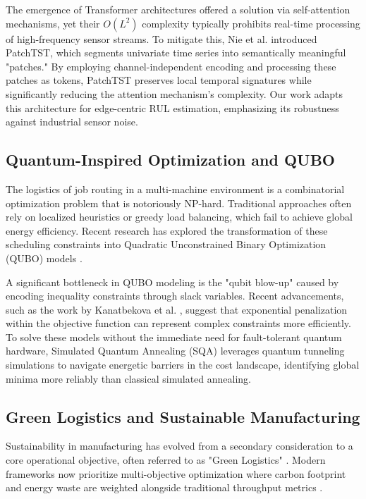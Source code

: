 \documentclass[conference]{IEEEtran}
\begin{document}
The emergence of Transformer architectures offered a solution via self-attention mechanisms, yet their $O(L^2)$ complexity typically prohibits real-time processing of high-frequency sensor streams. To mitigate this, Nie et al. \cite{nie2023patchtst} introduced PatchTST, which segments univariate time series into semantically meaningful "patches." By employing channel-independent encoding and processing these patches as tokens, PatchTST preserves local temporal signatures while significantly reducing the attention mechanism's complexity. Our work adapts this architecture for edge-centric RUL estimation, emphasizing its robustness against industrial sensor noise.

\subsection{Quantum-Inspired Optimization and QUBO}
The logistics of job routing in a multi-machine environment is a combinatorial optimization problem that is notoriously NP-hard. Traditional approaches often rely on localized heuristics or greedy load balancing, which fail to achieve global energy efficiency. Recent research has explored the transformation of these scheduling constraints into Quadratic Unconstrained Binary Optimization (QUBO) models \cite{ref15}.

A significant bottleneck in QUBO modeling is the "qubit blow-up" caused by encoding inequality constraints through slack variables. Recent advancements, such as the work by Kanatbekova et al. \cite{ref13}, suggest that exponential penalization within the objective function can represent complex constraints more efficiently. To solve these models without the immediate need for fault-tolerant quantum hardware, Simulated Quantum Annealing (SQA) \cite{ref16} leverages quantum tunneling simulations to navigate energetic barriers in the cost landscape, identifying global minima more reliably than classical simulated annealing.

\subsection{Green Logistics and Sustainable Manufacturing}
Sustainability in manufacturing has evolved from a secondary consideration to a core operational objective, often referred to as "Green Logistics" \cite{ref3}. Modern frameworks now prioritize multi-objective optimization where carbon footprint and energy waste are weighted alongside traditional throughput metrics \cite{ref1_new, ref2}.
\end{document}

